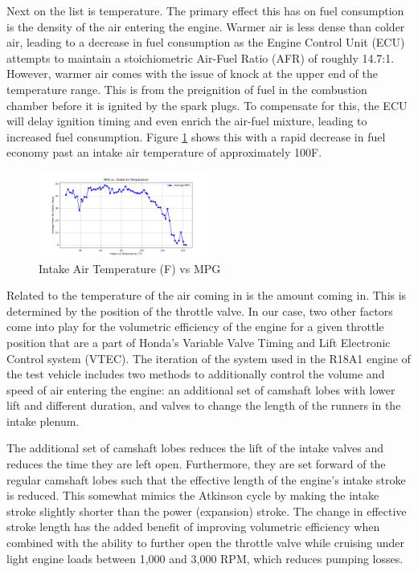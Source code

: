 \documentclass[letterpaper]{article}
\begin{document}
Next on the list is temperature. The primary effect this has on fuel 
consumption is the density of the air entering the engine. Warmer air is 
less dense than colder air, leading to a decrease in fuel consumption as 
the Engine Control Unit (ECU) attempts to maintain a stoichiometric 
Air-Fuel Ratio (AFR) of roughly 14.7:1. However, warmer air comes with the 
issue of knock at the upper end of the temperature range. This is from the 
preignition of fuel in the combustion chamber before it is ignited by the 
spark plugs. To compensate for this, the ECU will delay ignition timing and 
even enrich the air-fuel mixture, leading to increased fuel consumption. 
Figure \ref{fig:intakeairtempmpg} shows this with a rapid decrease in fuel 
economy past an intake air temperature of approximately 100\textdegree F.

\begin{figure}[htbp]
    \centering
    \includegraphics[width=0.5\textwidth]{figures/intake_air_temp_mpg.png}
    \caption{Intake Air Temperature (\textdegree F) vs MPG}
    \label{fig:intakeairtempmpg}
\end{figure}

Related to the temperature of the air coming in is the amount coming in. 
This is determined by the position of the throttle valve. In our case, two 
other factors come into play for the volumetric efficiency of the engine 
for a given throttle position that are a part of Honda's Variable Valve 
Timing and Lift Electronic Control system (VTEC). The iteration of the 
system used in the R18A1 engine of the test vehicle includes two methods 
to additionally control the volume and speed of air entering the engine: 
an additional set of camshaft lobes with lower lift and different 
duration, and valves to change the length of the runners in the intake 
plenum. 

The additional set of camshaft lobes reduces the lift of the intake valves 
and reduces the time they are left open. Furthermore, they are set forward 
of the regular camshaft lobes such that the effective length of the 
engine's intake stroke is reduced. This somewhat mimics the Atkinson cycle 
by making the intake stroke slightly shorter than the power (expansion) 
stroke. The change in effective stroke length has the added benefit of 
improving volumetric efficiency when combined with the ability to further 
open the throttle valve while cruising under light engine loads between 
1,000 and 3,000 RPM, which reduces pumping losses.
\end{document}
